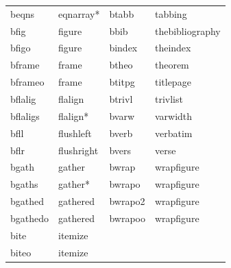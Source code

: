\documentclass[11pt,french]{article}
\newcommand{\CCT}{\textsf{CommandCompletion.txt}}
\begin{document}
\begin{table}
\begin{tabular}{llll}
beqns     & eqnarray*   & btabb   & tabbing \\
bfig      & figure      & bbib    & thebibliography \\
bfigo     & figure      & bindex  & theindex \\
bframe    & frame       & btheo   & theorem \\
bframeo   & frame       & btitpg  & titlepage \\
bflalig   & flalign     & btrivl  & trivlist \\
bflaligs  & flalign*    & bvarw   & varwidth \\
bfll      & flushleft   & bverb   & verbatim \\
bflr      & flushright  & bvers   & verse \\
bgath     & gather      & bwrap   & wrapfigure \\
bgaths    & gather*     & bwrapo  & wrapfigure \\
bgathed   & gathered    & bwrapo2 & wrapfigure \\
bgathedo  & gathered    & bwrapoo & wrapfigure \\
bite      & itemize     &         & \\
biteo     & itemize     &         & \\
\end{tabular}
\end{table}
\end{document}
